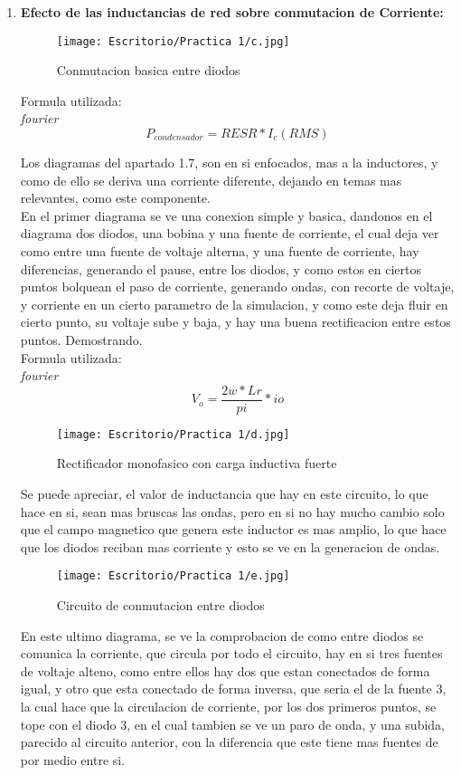 \documentclass[11pt,a4paper]{article}
\begin{document}
\begin{enumerate}
  \item \textbf{Efecto de las inductancias de red sobre conmutacion de Corriente:}
 \begin{figure}[hbtp]
 \centering
 \texttt{[image: Escritorio/Practica 1/c.jpg]}
 \caption{Conmutacion basica entre diodos}
 \end{figure}
 
 Formula utilizada:\\
 \emph{fourier}
  $$ P_{condensador}= R{ESR}* I_{c}(RMS)$$
  
Los diagramas del apartado 1.7, son en si enfocados, mas a la inductores, y como de ello se deriva una corriente diferente, dejando en  temas mas relevantes, como este componente.\\
En el primer diagrama se ve una conexion simple y basica, dandonos en el diagrama dos diodos, una bobina y una fuente de corriente, el cual deja ver como entre una fuente de voltaje alterna, y una fuente de corriente, hay diferencias, generando el pause, entre los diodos, y como estos en ciertos puntos bolquean el paso de corriente, generando ondas, con recorte de voltaje, y corriente en un cierto parametro de la simulacion, y como este deja fluir en cierto punto, su voltaje sube y baja, y hay una buena rectificacion entre estos puntos. Demostrando.\\
Formula utilizada:\\
 \emph{fourier}
$$ V_{o}= \frac{2w*L{r}}{pi}* i{o} $$
 
 \begin{figure}[hbtp]
 \centering
 \texttt{[image: Escritorio/Practica 1/d.jpg]}
 \caption{Rectificador monofasico con carga inductiva fuerte}
 \end{figure}
 
 
Se puede apreciar, el valor de inductancia que hay en este circuito, lo que hace en si, sean mas bruscas las ondas, pero en si no hay mucho cambio solo que el campo magnetico que genera este inductor es mas amplio, lo que hace que los diodos reciban mas corriente y esto se ve en la generacion de ondas.
 
\begin{figure}[hbtp]
\centering
\texttt{[image: Escritorio/Practica 1/e.jpg]}
\caption{Circuito de conmutacion entre diodos}
\end{figure}

 
En este ultimo diagrama, se ve la comprobacion de como entre diodos se comunica la corriente, que circula por todo el circuito, hay en si tres fuentes de voltaje alteno, como entre ellos hay dos que estan conectados de forma igual, y otro que esta conectado de forma inversa, que seria el de la fuente 3, la cual hace que la circulacion de corriente, por los dos primeros puntos, se tope con el diodo 3, en el cual tambien se ve un paro de onda, y una subida, parecido al circuito anterior, con la diferencia que este tiene mas fuentes de por medio entre si.\\


\end{enumerate}
\end{document}
